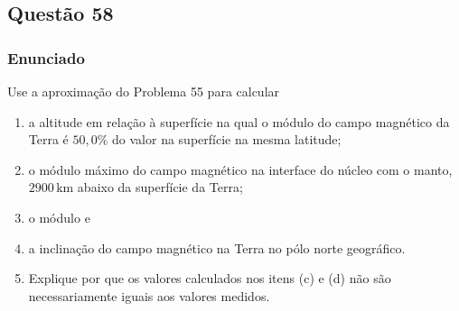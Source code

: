 \subsection{Questão 58}

\subsubsection{Enunciado}

Use a aproximação do Problema 55 para calcular

\begin{enumerate}
    \item[(a)] a altitude em relação à superfície na qual o módulo do campo magnético da Terra é \(50{,}0\%\) do valor na superfície na mesma latitude;

    \item[(b)] o módulo máximo do campo magnético na interface do núcleo com o manto, \(2900\,\text{km}\) abaixo da superfície da Terra;

    \item[(c)] o módulo e

    \item[(d)] a inclinação do campo magnético na Terra no pólo norte geográfico.

    \item[(e)] Explique por que os valores calculados nos itens (c) e (d) não são necessariamente iguais aos valores medidos.
\end{enumerate}



\vspace{1cm}

